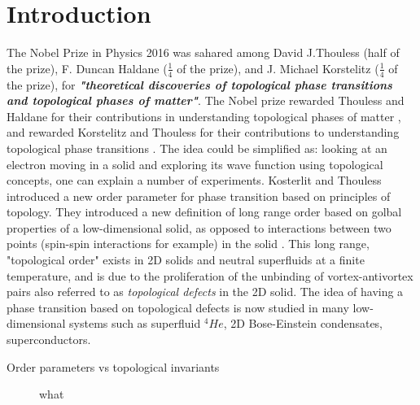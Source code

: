 \section{\label{sec:intro}Introduction}
The Nobel Prize in Physics 2016 was sahared among David J.Thouless (half of the prize), F. Duncan Haldane ($\frac{1}{4}$ of the prize), and J. Michael Korstelitz ($\frac{1}{4}$ of the prize), for \textbf{\textit{"theoretical discoveries of topological phase transitions and topological phases of matter"}}. The Nobel prize rewarded Thouless and Haldane for their contributions in understanding topological phases of matter \cite{thouless_quantized_1982}, and rewarded Korstelitz and Thouless for their contributions to understanding topological phase transitions \cite{kosterlitz_ordering_1973}. The idea could be simplified as: looking at an electron moving in a solid and exploring its wave function using topological concepts, one can explain a number of experiments. Kosterlit and Thouless introduced a new order parameter for phase transition based on principles of topology. They introduced a new definition of long range order based on golbal properties of a low-dimensional solid, as opposed to interactions between two points (spin-spin interactions for example) in the solid \cite{kosterlitz_ordering_1973}. This long range, "topological order" exists in 2D solids and neutral superfluids at a finite temperature, and is due to the proliferation of the unbinding of vortex-antivortex pairs also referred to as \textit{topological defects} in the 2D solid. 
The idea of having a phase transition based on topological defects is now studied in many low-dimensional systems such as superfluid $^4He$, 2D Bose-Einstein condensates, superconductors.
\begin{description}
    \item[Order parameters vs topological invariants] what 
\end{description} 